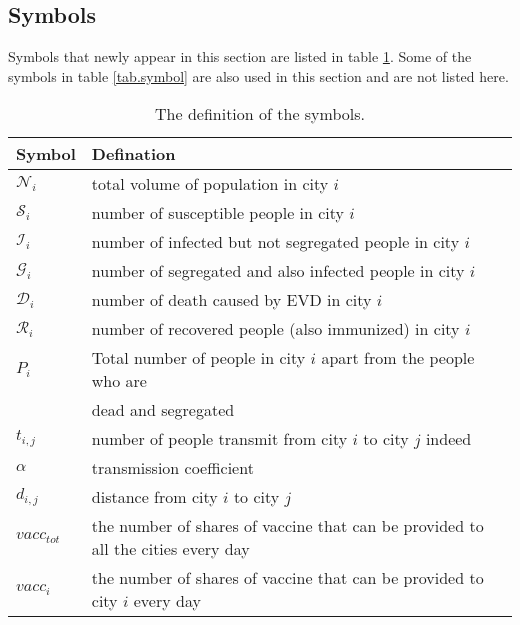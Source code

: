 \subsection{Symbols}
Symbols that newly appear in this section are listed in table \ref{tab.symbol2}. Some of the symbols in table \ref{tab.symbol} are also used in this section and are not listed here.
\begin{table}[htbp]
             \centering
                \begin{tabular}{|l|l|}
                \hline
                Symbol & Defination \\
                \hline
                 $\mathcal{N}_i$ & total volume of population in city $i$\\

                $\mathcal{S}_i$ & number of susceptible people in city $i$\\

                $\mathcal{I}_i$ & number of infected but not segregated people in city $i$\\

                $\mathcal{G}_i$ & number of segregated and also infected people in city $i$\\

                $\mathcal{D}_i$ & number of death caused by EVD in city $i$\\

                $\mathcal{R}_i$ & number of recovered people (also immunized) in city $i$\\
                
                \textbf{$P_{i}$} & Total number of people in city $i$ apart from the people who are \\ & dead and segregated \\

                \textbf{$t_{i,j}$} & number of people transmit from city $i$ to city $j$ indeed \\

                \textbf{$\alpha$} & transmission coefficient \\

                \textbf{$d_{i,j}$} & distance from city $i$ to city $j$ \\
                
                $vacc_{tot}$ & the number of shares of vaccine that can be provided to all the cities every day\\
                
                $vacc_{i}$ & the number of shares of vaccine that can be provided to city $i$ every day\\
                \hline
                \end{tabular}
                \caption{The definition of the symbols.}  \label{tab.symbol2}
\end{table}

